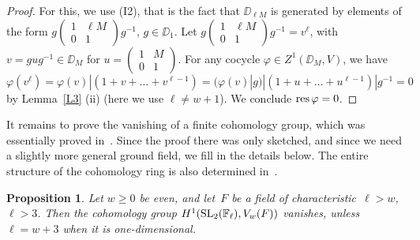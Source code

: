 \documentclass{amsart}
\theoremstyle{plain}
\newtheorem{proposition}[theorem]{Proposition}
\theoremstyle{definition}
\numberwithin{equation}{section}
\def\SL{\mathrm{SL}} \def\PSL{\mathrm{PSL}}\def\GL{\mathrm{GL}}\def\PGL{\mathrm{PGL}}
\def\sm#1#2#3#4{\left(\begin{smallmatrix}#1&#2 \\ #3 & #4 \end{smallmatrix}\right)}
\def\vp{\varphi}
\begin{document}
\begin{proof}
For this, we use (I2),  that is the fact that $\DD_{\ell M}$ is generated by elements of the
form $g \sm 1{\ell M} 01 g^{-1}$, $g \in \DD_1$. Let
$g \sm 1{\ell M} 01 g^{-1}=v^{\ell}$, with $v=g u g^{-1}\in \DD_M$ for 
$u=\sm 1M01$. For any cocycle  $\vp\in Z^1(\DD_M,V)$,   
we have  
\[\vp(v^{\ell})=\vp(v)|(1+v+\ldots
+v^{\ell-1})=(\vp(v)|g)|(1+u+\ldots +u^{\ell-1})|g^{-1}=0  \] 
by Lemma~\ref{L3} (ii) (here we use $\ell\ne w+1$). We conclude $\res \vp=0$.
\end{proof}

It remains to prove the vanishing of a finite cohomology group,
which was essentially proved in~\cite[Theorem 1.5.3]{KPS}. Since the proof
there was only sketched, and since we need a slightly more general
ground field, we fill in the details below.  
The entire structure of the cohomology ring is also determined in~\cite{Te}.
\begin{proposition}\label{P4} Let $w\ge 0$ be even, and let~$F$ be a field 
of characteristic~$\ell>w$, $\ell>3$. Then the cohomology 
group $H^1(\SL_2(\FF_\ell), V_w(F))$ vanishes,
unless $\ell=w+3$ when it is one-dimensional.
\end{proposition}
\end{document}
